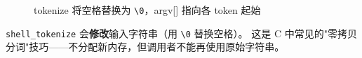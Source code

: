 \begin{figure}[H]
  \centering
  
  \caption{tokenize 将空格替换为 \texttt{\textbackslash 0}，argv[] 指向各 token 起始}
\end{figure}

\begin{warnbox}
\texttt{shell\_tokenize} 会\textbf{修改}输入字符串（用 \texttt{\textbackslash 0} 替换空格）。
这是 C 中常见的"零拷贝分词"技巧——不分配新内存，但调用者不能再使用原始字符串。
\end{warnbox}


